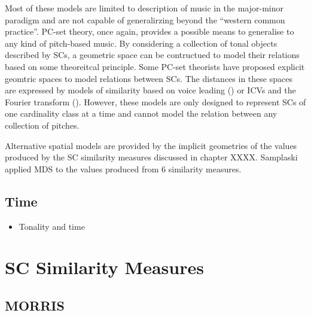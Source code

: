 \documentclass{article}
\begin{document}
Most of these models are limited to description of music in the
major-minor paradigm and are not capable of generalirzing beyond the
``western common practice''. PC-set theory, once again, provides a
possible means to generalise to any kind of pitch-based music. By
considering a collection of tonal objects described by SCs, a
geometric space can be contructued to model their relations based on
some theoreitcal principle. Some PC-set theorists have proposed
explicit geomtric spaces to model relations between SCs. The distances
in these spaces are expressed by models of similarity based on voice
leading (\citep{Cohn2003,Tymoczko2012}) or ICVs and the Fourier
transform (\citep{Quinn2006, Quinn2007}). However, these models are
only designed to represent SCs of one cardinality class at a time and
cannot model the relation between any collection of pitches.

Alternative spatial models are provided by the implicit geometries of
the values produced by the SC similarity measures discussed in chapter
XXXX. Samplaski applied MDS to the values produced from 6 similarity
measures.
\subsection{Time}
\label{sec-5-5}

\begin{itemize}
\item Tonality and time \citep{Martorell2013}
\end{itemize}
\section{SC Similarity Measures}
\label{sec-6}
\subsection{MORRIS}
\label{sec-6-1}
\end{document}
